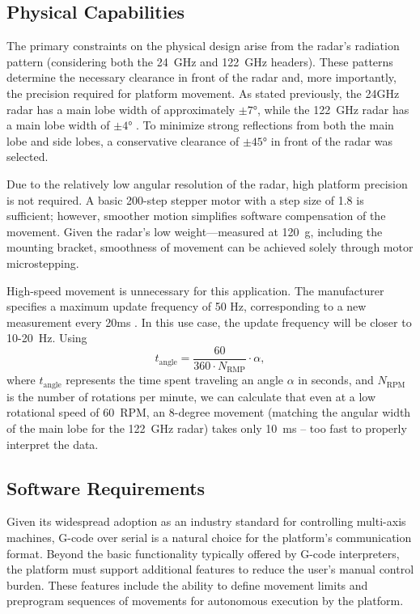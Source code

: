 \subsection{Physical Capabilities}

The primary constraints on the physical design arise from the radar’s radiation pattern (considering both the 24~GHz and 122~GHz headers).
These patterns determine the necessary clearance in front of the radar and, more importantly, the precision required for platform movement.
As stated previously, the 24GHz radar has a main lobe width of approximately $\pm7\text{°}$, while the 122~GHz radar has a main lobe width of $\pm4\text{°}$ \cite{sidarTRX122}.
To minimize strong reflections from both the main lobe and side lobes, a conservative clearance of $\pm45\text{°}$ in front of the radar was selected.

Due to the relatively low angular resolution of the radar, high platform precision is not required.
A basic 200-step stepper motor with a step size of 1.8 is sufficient; however, smoother motion simplifies software compensation of the movement.
Given the radar’s low weight—measured at 120~g, including the mounting bracket, smoothness of movement can be achieved solely through motor microstepping.

High-speed movement is unnecessary for this application.
The manufacturer specifies a maximum update frequency of 50 Hz, corresponding to a new measurement every 20ms \cite{sidarMAN}.
In this use case, the update frequency will be closer to 10-20~Hz.
Using
%
\begin{equation}
  t_{\mathrm{angle}} = \frac{60}{360\cdot N_{\mathrm{RMP}}} \cdot  \alpha,
  \label{eq:poll}
\end{equation}
%
where $t_{\mathrm{angle}}$ represents the time spent traveling an angle $\alpha$ in seconds, and $N_{\mathrm{RPM}}$ is the number of rotations per minute, we can calculate that even at a low rotational speed of 60~RPM, an 8-degree movement (matching the angular width of the main lobe for the 122~GHz radar) takes only 10~ms -- too fast to properly interpret the data.


\subsection{Software Requirements}

Given its widespread adoption as an industry standard for controlling multi-axis machines, G-code over serial is a natural choice for the platform's communication format.
Beyond the basic functionality typically offered by G-code interpreters, the platform must support additional features to reduce the user's manual control burden.
These features include the ability to define movement limits and preprogram sequences of movements for autonomous execution by the platform.

